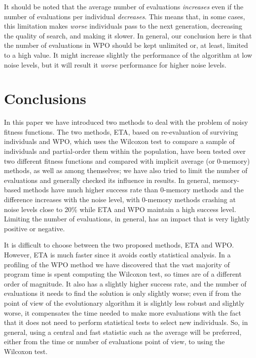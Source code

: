 \documentclass{llncs}
\begin{document}
It should be noted that the average number of evaluations {\em
  increases} even if the number of evaluations per individual {\em
  decreases}. This means that, in some cases, this limitation makes
{\em worse} individuals pass to the next generation, decreasing the
quality of search, and making it slower. In general, our conclusion
here is that the number of evaluations in WPO should be kept unlimited
or, at least, limited to a high value. It might increase slightly the
performance of the algorithm at low noise levels, but it will result
it {\em worse} performance for higher noise levels. 


\section{Conclusions}

In this paper we have introduced two methods to deal with the problem
of noisy fitness functions. The two methods, {\sf ETA}, based on
re-evaluation of surviving individuals and {\sf WPO}, which uses the
Wilcoxon test to compare a sample of individuals and partial-order
them within the population, 
 have been tested over two
different fitness functions and compared with implicit average (or
0-memory) methods, as well as among themselves; we have also tried to
limit the number of evaluations and generally checked its influence in
results. In general,
memory-based methods have much higher success rate than 0-memory
methods and the difference increases with the noise level, with
0-memory methods crashing at noise levels close to 20\% while ETA and
WPO maintain a high success level. Limiting the number of evaluations,
in general, has an impact that is very lightly positive or
negative. 

It is difficult to choose between the two proposed methods, ETA and
WPO. However, ETA is much faster since it avoids costly
statistical analysis. In a profiling of the WPO method we have
discovered that the vast majority of program time is spent computing
the Wilcoxon test, so times are of a different order of magnitude. 
It also has a slightly higher success rate, and the
number of evaluations it needs to find the solution is only slightly
worse; even if from the point of view of the evolutionary algorithm it
is slightly less robust and slightly worse, it compensates the time
needed to make more evaluations with the fact that it does not need to
perform statistical tests to select new individuals. So, in general,
using a central and fast statistic such as the average will be
preferred, either from the time or number of evaluations point of
view, to using the Wilcoxon test. 
\end{document}
